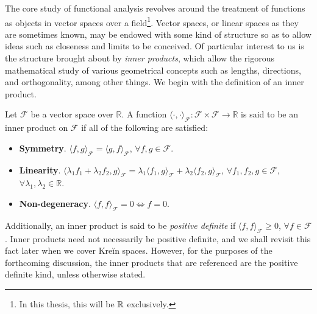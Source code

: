 The core study of functional analysis revolves around the treatment of functions as objects in vector spaces over a field\footnote{In this thesis, this will be $\mathbb{R}$ exclusively.}.
Vector spaces, or linear spaces as they are sometimes known, may be endowed with some kind of structure so as to allow ideas such as closeness and limits to be conceived.
Of particular interest to us is the structure brought about by \emph{inner products}, which allow the rigorous mathematical study of various geometrical concepts such as lengths, directions, and orthogonality, among other things.
We begin with the definition of an inner product. 
%
\begin{definition}\label{def:innerprod}
	Let $\mathcal F$ be a vector space over $\mathbb R$. A function $\langle\cdot,\cdot\rangle_{\mathcal F}:\mathcal F \times \mathcal F \rightarrow \mathbb R$ is said to be an inner product on $\mathcal F$ if all of the following are satisfied:
	\begin{itemize}
	\item \textbf{Symmetry}. $\langle f, g\rangle_{\mathcal F} = \langle g, f	\rangle_{\mathcal F}$, $\forall f,g \in \mathcal F$.
	\item \textbf{Linearity}. $\langle \lambda_1 f_1 + \lambda_2 f_2, g\rangle_{\mathcal F} = \lambda_1\langle f_1,g \rangle_{\mathcal F} + \lambda_2\langle f_2,g \rangle_{\mathcal F}$, $\forall f_1, f_2, g \in \mathcal F$, $\forall \lambda_1,\lambda_2 \in \mathbb R$.
	\item \textbf{Non-degeneracy}. $\langle f, f\rangle_{\mathcal F} = 0 \Leftrightarrow f=0$.
	\end{itemize}
\end{definition}
%
Additionally, an inner product is said to be \emph{positive definite} if $\langle f, f\rangle_{\mathcal F} \geq 0$, $\forall f \in \mathcal F$.
Inner products need not necessarily be positive definite, and we shall revisit this fact later when we cover Kreĭn spaces.
However, for the purposes of the forthcoming discussion, the inner products that are referenced are the positive definite kind, unless otherwise stated.

